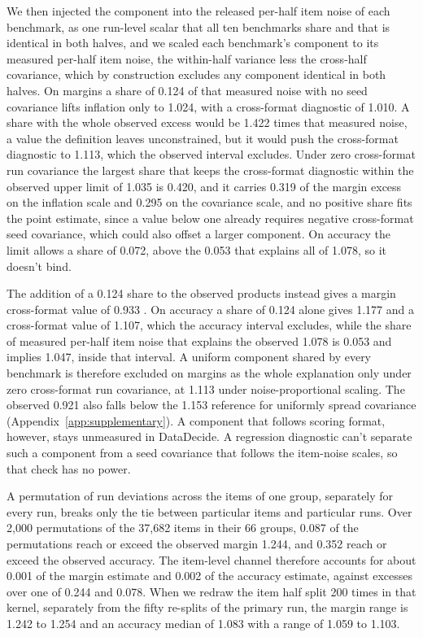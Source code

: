 We then injected the component into the released per-half item noise of each benchmark, as one run-level scalar that all ten benchmarks share and that is identical in both halves, and we scaled each benchmark's component to its measured per-half item noise, the within-half variance less the cross-half covariance, which by construction excludes any component identical in both halves. On margins a share of 0.124 of that measured noise with no seed covariance lifts inflation only to 1.024, with a cross-format diagnostic of 1.010. A share with the whole observed excess would be 1.422 times that measured noise, a value the definition leaves unconstrained, but it would push the cross-format diagnostic to 1.113, which the observed interval  excludes. Under zero cross-format run covariance the largest share that keeps the cross-format diagnostic within the observed upper limit of 1.035 is 0.420, and it carries 0.319 of the margin excess on the inflation scale and 0.295 on the covariance scale, and no positive share fits the point estimate, since a value below one already requires negative cross-format seed covariance, which could also offset a larger component. On accuracy the limit allows a share of 0.072, above the 0.053 that explains all of 1.078, so it doesn't bind.

The addition of a 0.124 share to the observed products instead gives a margin cross-format value of 0.933 . On accuracy a share of 0.124 alone gives 1.177 and a cross-format value of 1.107, which the accuracy interval  excludes, while the share of measured per-half item noise that explains the observed 1.078 is 0.053 and implies 1.047, inside that interval. A uniform component shared by every benchmark is therefore excluded on margins as the whole explanation only under zero cross-format run covariance, at 1.113 under noise-proportional scaling. The observed 0.921 also falls below the 1.153 reference for uniformly spread covariance (Appendix~\ref{app:supplementary}). A component that follows scoring format, however, stays unmeasured in DataDecide. A regression diagnostic can't separate such a component from a seed covariance that follows the item-noise scales, so that check has no power.

A permutation of run deviations across the items of one group, separately for every run, breaks only the tie between particular items and particular runs. Over 2,000 permutations of the 37,682 items in their 66 groups, 0.087 of the permutations reach or exceed the observed margin 1.244, and 0.352 reach or exceed the observed accuracy. The item-level channel therefore accounts for about 0.001 of the margin estimate and 0.002 of the accuracy estimate, against excesses over one of 0.244 and 0.078. When we redraw the item half split 200 times in that kernel, separately from the fifty re-splits of the primary run, the margin range is 1.242 to 1.254 and an accuracy median of 1.083 with a range of 1.059 to 1.103.

